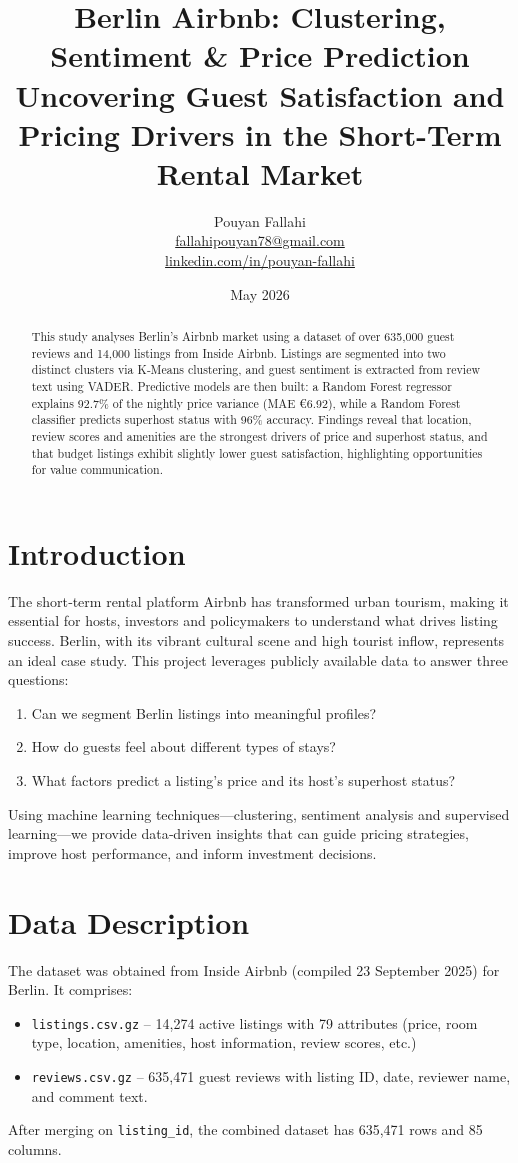 \documentclass[11pt,a4paper]{article}
\title{\textbf{Berlin Airbnb: Clustering, Sentiment \& Price Prediction}\\ 
\large Uncovering Guest Satisfaction and Pricing Drivers in the Short-Term Rental Market}
\author{Pouyan Fallahi\\
\href{mailto:fallahipouyan78@gmail.com}{fallahipouyan78@gmail.com}\\
\href{https://linkedin.com/in/pouyan-fallahi}{linkedin.com/in/pouyan-fallahi}}
\date{May 2026}
\begin{document}
\maketitle

\begin{abstract}
This study analyses Berlin’s Airbnb market using a dataset of over 635,000 guest reviews and 14,000 listings from Inside Airbnb. Listings are segmented into two distinct clusters via K‑Means clustering, and guest sentiment is extracted from review text using VADER. Predictive models are then built: a Random Forest regressor explains 92.7\% of the nightly price variance (MAE €6.92), while a Random Forest classifier predicts superhost status with 96\% accuracy. Findings reveal that location, review scores and amenities are the strongest drivers of price and superhost status, and that budget listings exhibit slightly lower guest satisfaction, highlighting opportunities for value communication.
\end{abstract}

\section{Introduction}
The short‑term rental platform Airbnb has transformed urban tourism, making it essential for hosts, investors and policymakers to understand what drives listing success. Berlin, with its vibrant cultural scene and high tourist inflow, represents an ideal case study. This project leverages publicly available data to answer three questions:
\begin{enumerate}[label=(\roman*)]
    \item Can we segment Berlin listings into meaningful profiles?
    \item How do guests feel about different types of stays?
    \item What factors predict a listing’s price and its host’s superhost status?
\end{enumerate}
Using machine learning techniques—clustering, sentiment analysis and supervised learning—we provide data‑driven insights that can guide pricing strategies, improve host performance, and inform investment decisions.

\section{Data Description}
The dataset was obtained from Inside Airbnb (compiled 23 September 2025) for Berlin. It comprises:
\begin{itemize}
    \item \texttt{listings.csv.gz} – 14,274 active listings with 79 attributes (price, room type, location, amenities, host information, review scores, etc.)
    \item \texttt{reviews.csv.gz} – 635,471 guest reviews with listing ID, date, reviewer name, and comment text.
\end{itemize}
After merging on \texttt{listing\_id}, the combined dataset has 635,471 rows and 85 columns.
\end{document}
